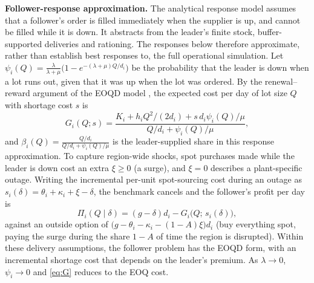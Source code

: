 \documentclass{ifacconf}
\newcommand{\rev}[1]{#1}
\newcommand{\dl}{\delta}
\begin{document}
\rev{\textbf{Follower-response approximation.} The analytical response model assumes that a follower's order is filled immediately when the supplier is up, and cannot be filled while it is down. It abstracts from the leader's finite stock, buffer-supported deliveries and rationing. The responses below therefore approximate, rather than establish best responses to, the full operational simulation. Let} $\psi_i(Q)=\frac{\lambda}{\lambda+\mu}\big(1-e^{-(\lambda+\mu)Q/d_i}\big)$ be the probability that the leader is down when a lot runs out, given that it was up when the lot was ordered. By the renewal--reward argument of the EOQD model \citep{parlar1991,snyder2019}, the expected cost per day of lot size $Q$ with shortage cost $s$ is
\begin{equation}\label{eq:G}
G_i(Q;s)=\frac{K_i+h_iQ^2/(2d_i)+s\,d_i\psi_i(Q)/\mu}{Q/d_i+\psi_i(Q)/\mu},
\end{equation}
\rev{and $\beta_i(Q)=\frac{Q/d_i}{Q/d_i+\psi_i(Q)/\mu}$ is the leader-supplied share in this response approximation.} To capture region-wide shocks, spot purchases made while the leader is down cost an extra $\xi\ge0$ (a surge), and $\xi=0$ describes a plant-specific outage. \rev{Writing the incremental per-unit spot-sourcing cost during an outage as $s_i(\dl)=\theta_i+\kappa_i+\xi-\dl$}, the benchmark cancels and the follower's profit per day is
\begin{equation}\label{eq:follower}
\Pi_i(Q\mid\dl)=(g-\dl)d_i-G_i\big(Q;\,s_i(\dl)\big),
\end{equation}
against an outside option of $\big(g-\theta_i-\kappa_i-(1-A)\xi\big)d_i$ (buy everything spot, paying the surge during the share $1-A$ of time the region is disrupted). \rev{Within these delivery assumptions, the follower problem has the EOQD form, with an incremental shortage cost that depends on the leader's premium.} As $\lambda\to0$, $\psi_i\to0$ and \eqref{eq:G} reduces to the EOQ cost.

\end{document}
